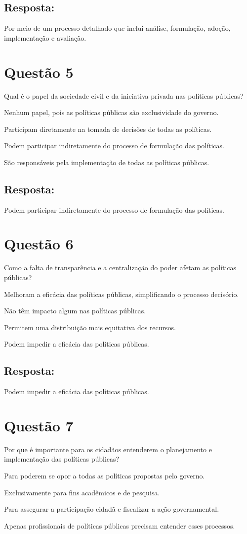 \documentclass[
   article,       
   12pt,          
   oneside,       
   a4paper,       
   english,       
   brazil,        
   sumario=tradicional
   ]{abntex2}
\begin{document}
\subsection{Resposta:}
Por meio de um processo detalhado que inclui análise, formulação, adoção, implementação e avaliação.
\section{Questão 5}
Qual é o papel da sociedade civil e da iniciativa privada nas políticas públicas?
\itemize
    \item Nenhum papel, pois as políticas públicas são exclusividade do governo.
    \item Participam diretamente na tomada de decisões de todas as políticas.
    \item Podem participar indiretamente do processo de formulação das políticas.
    \item São responsáveis pela implementação de todas as políticas públicas.
\subsection{Resposta:}
Podem participar indiretamente do processo de formulação das políticas.
\section{Questão 6}
Como a falta de transparência e a centralização do poder afetam as políticas públicas?
\itemize
    \item Melhoram a eficácia das políticas públicas, simplificando o processo decisório.
    \item Não têm impacto algum nas políticas públicas.
    \item Permitem uma distribuição mais equitativa dos recursos.
    \item Podem impedir a eficácia das políticas públicas.
\subsection{Resposta:}
Podem impedir a eficácia das políticas públicas.
\section{Questão 7}
Por que é importante para os cidadãos entenderem o planejamento e implementação das políticas públicas?
\itemize
    \item Para poderem se opor a todas as políticas propostas pelo governo.
    \item Exclusivamente para fins acadêmicos e de pesquisa.
    \item Para assegurar a participação cidadã e fiscalizar a ação governamental.
    \item Apenas profissionais de políticas públicas precisam entender esses processos.
\end{document}
